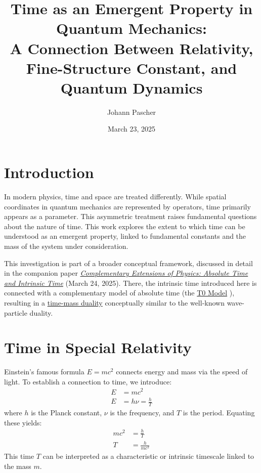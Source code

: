 \documentclass[12pt,a4paper]{article}
\title{Time as an Emergent Property in Quantum Mechanics: \\A Connection Between Relativity, Fine-Structure Constant, and Quantum Dynamics}
\author{Johann Pascher}
\date{March 23, 2025}
\begin{document}
	
	\maketitle
	
	\tableofcontents
	\newpage
	
	\section{Introduction}
	In modern physics, time and space are treated differently. While spatial coordinates in quantum mechanics are represented by operators, time primarily appears as a parameter. This asymmetric treatment raises fundamental questions about the nature of time. This work explores the extent to which time can be understood as an emergent property, linked to fundamental constants and the mass of the system under consideration.
	
	This investigation is part of a broader conceptual framework, discussed in detail in the companion paper \href{https://github.com/jpascher/T0-Time-Mass-Duality/tree/main/2/pdf/English/KomplementPhysikZeitEn.pdf}{\textit{Complementary Extensions of Physics: Absolute Time and Intrinsic Time}} \cite{pascher1} (March 24, 2025). There, the intrinsic time introduced here is connected with a complementary model of absolute time (the \href{https://github.com/jpascher/T0-Time-Mass-Duality/tree/main/2/pdf/English/ZeitMasseT0ParamsEn.pdf}{T0 Model} \cite{pascher_params_2025}), resulting in a \href{https://github.com/jpascher/T0-Time-Mass-Duality/tree/main/2/pdf/English/MathZeitMasseLagrangeEn.pdf}{time-mass duality} \cite{pascher_lagrange_2025} conceptually similar to the well-known wave-particle duality.
	
	\section{Time in Special Relativity}
	Einstein’s famous formula \( E = mc^2 \) connects energy and mass via the speed of light. To establish a connection to time, we introduce:
	\begin{align}
		E &= mc^2 \\
		E &= h\nu = \frac{h}{T}
	\end{align}
	where \( h \) is the Planck constant, \( \nu \) is the frequency, and \( T \) is the period. Equating these yields:
	\begin{align}
		mc^2 &= \frac{h}{T} \\
		T &= \frac{h}{mc^2}
	\end{align}
	This time \( T \) can be interpreted as a characteristic or intrinsic timescale linked to the mass \( m \).
	
\end{document}
